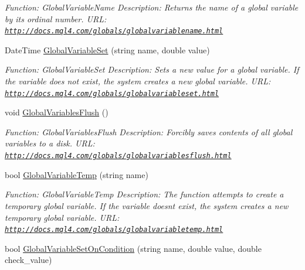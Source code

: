 \begin{DoxyCompactItemize}
\begin{DoxyCompactList}\small\item\em Function\+: Global\+Variable\+Name Description\+: Returns the name of a global variable by its ordinal number. U\+RL\+: \href{http://docs.mql4.com/globals/globalvariablename.html}{\tt http\+://docs.\+mql4.\+com/globals/globalvariablename.\+html} \end{DoxyCompactList}\item 
Date\+Time \hyperlink{class_m_q_l4_c_sharp_1_1_base_1_1_m_q_l_base_a1c7de51b7a89519094ba44050c203588}{Global\+Variable\+Set} (string name, double value)
\begin{DoxyCompactList}\small\item\em Function\+: Global\+Variable\+Set Description\+: Sets a new value for a global variable. If the variable does not exist, the system creates a new global variable. U\+RL\+: \href{http://docs.mql4.com/globals/globalvariableset.html}{\tt http\+://docs.\+mql4.\+com/globals/globalvariableset.\+html} \end{DoxyCompactList}\item 
void \hyperlink{class_m_q_l4_c_sharp_1_1_base_1_1_m_q_l_base_a21f5336d1c9c67b7ac5f287ecc164240}{Global\+Variables\+Flush} ()
\begin{DoxyCompactList}\small\item\em Function\+: Global\+Variables\+Flush Description\+: Forcibly saves contents of all global variables to a disk. U\+RL\+: \href{http://docs.mql4.com/globals/globalvariablesflush.html}{\tt http\+://docs.\+mql4.\+com/globals/globalvariablesflush.\+html} \end{DoxyCompactList}\item 
bool \hyperlink{class_m_q_l4_c_sharp_1_1_base_1_1_m_q_l_base_abd246bf141672cc46875118be35e5ce2}{Global\+Variable\+Temp} (string name)
\begin{DoxyCompactList}\small\item\em Function\+: Global\+Variable\+Temp Description\+: The function attempts to create a temporary global variable. If the variable doesn\textquotesingle{}t exist, the system creates a new temporary global variable. U\+RL\+: \href{http://docs.mql4.com/globals/globalvariabletemp.html}{\tt http\+://docs.\+mql4.\+com/globals/globalvariabletemp.\+html} \end{DoxyCompactList}\item 
bool \hyperlink{class_m_q_l4_c_sharp_1_1_base_1_1_m_q_l_base_a02ee84d277fe360eedb32456b17d076b}{Global\+Variable\+Set\+On\+Condition} (string name, double value, double check\+\_\+value)

\end{DoxyCompactItemize}
